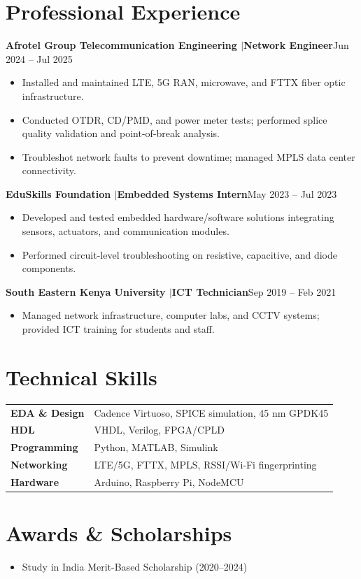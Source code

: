 \documentclass[10.5pt,letterpaper]{article}
\newcommand{\entry}[2]{\textbf{#1}\hfill #2\par}
\begin{document}
\section*{Professional Experience}
\entry{Afrotel Group Telecommunication Engineering \quad$|$\quad Network Engineer}{Jun 2024 -- Jul 2025}
\begin{itemize}
  \item Installed and maintained LTE, 5G RAN, microwave, and FTTX fiber optic infrastructure.
  \item Conducted OTDR, CD/PMD, and power meter tests; performed splice quality validation and
        point-of-break analysis.
  \item Troubleshot network faults to prevent downtime; managed MPLS data center connectivity.
\end{itemize}
\vspace{0.35em}
\entry{EduSkills Foundation \quad$|$\quad Embedded Systems Intern}{May 2023 -- Jul 2023}
\begin{itemize}
  \item Developed and tested embedded hardware/software solutions integrating sensors, actuators, and
        communication modules.
  \item Performed circuit-level troubleshooting on resistive, capacitive, and diode components.
\end{itemize}
\vspace{0.35em}
\entry{South Eastern Kenya University \quad$|$\quad ICT Technician}{Sep 2019 -- Feb 2021}
\begin{itemize}
  \item Managed network infrastructure, computer labs, and CCTV systems; provided ICT training for
        students and staff.
\end{itemize}

\section*{Technical Skills}
\begin{tabular}{@{}p{}p{}@{}}
  \textbf{EDA \& Design} & Cadence Virtuoso, SPICE simulation, 45 nm GPDK45 \\
  \textbf{HDL}           & VHDL, Verilog, FPGA/CPLD \\
  \textbf{Programming}   & Python, MATLAB, Simulink \\
  \textbf{Networking}    & LTE/5G, FTTX, MPLS, RSSI/Wi-Fi fingerprinting \\
  \textbf{Hardware}      & Arduino, Raspberry Pi, NodeMCU \\
\end{tabular}

\section*{Awards \& Scholarships}
\begin{itemize}
  \item Study in India Merit-Based Scholarship (2020--2024)
\end{itemize}
\end{document}
